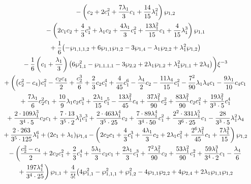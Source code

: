 \documentclass[pdftex]{sigma}
\numberwithin{equation}{section}
\begin{document}
\begin{gather*}
\hphantom{0=}{}
 - \left(c_2 + 2c_1^2 + \frac{7\lambda_1}{3} c_1 + \frac{14}{15}\lambda_1^2 \right) \wp_{1,2}\\
\hphantom{0=}{}
 - \left(2 c_1 c_2 + \frac{4}{3} c_1^3 + \lambda_1 c_2 + \frac{4 \lambda_1}{3} c_1^2 + \frac{13 \lambda_1^2}{15} c_1 + \frac{4}{15}\lambda_1^3 \right) \wp_{1,1}\\
 \hphantom{0=}{}
 + \frac{1}{6} \big({-} \wp_{1,1,1,2} + 6 \wp_{1,1}\wp_{1,2} - 3 \wp_{1,4}
 - \lambda_1 \wp_{2,2} + \lambda_1^2 \wp_{1,2}\big)\\
\hphantom{0=}{}
 - \frac{1}{6} \left(c_1+\frac{\lambda_1}{3}\right) \big( 6 \wp_{1,1}^2 - \wp_{1,1,1,1} - 3\wp_{2,2} + 2 \lambda_1 \wp_{1,2}
 + \lambda_1^2 \wp_{1,1} + 2\lambda_4\big) \bigg) \xi^{-3}\\
\hphantom{0=}{} +
 \left( \big(c_2^2 - c_4\big) c_1^2 - \frac{c_2 c_4}{2}
 + \frac{c_2^3}{6} + \frac{2}{3} c_2 c_1^4 + \frac{4}{45} c_1^6 - \frac{ \lambda _4}{2}c_2 -\frac{11\lambda_4}{15} c_1^2 - \frac{7^2}{90} \lambda _1 \lambda_4 c_1-\frac{9\lambda_1}{10} c_4 c_1\right. \\
\hphantom{0=}{}
+ \frac{7\lambda_1}{6} c_2^2 c_1 + \frac{10}{9} \lambda_1 c_2 c_1^3 + \frac{2 \lambda_1}{15} c_1^5 - \frac{13\lambda_1^2}{45} c_4 + \frac{37\lambda _1^2}{90} c_2^2 + \frac{83 \lambda_1^2}{90} c_2 c_1^2 + \frac{19 \lambda_1^2}{3^3 \cdot 5} c_1^4\\
\hphantom{0=}{} + \frac{2\cdot 109\lambda_1^3}{3^4 \cdot 5} c_2 c_1+ \frac{7\cdot 13}{3^5 \cdot 2} \lambda_1^3 c_1^3 + \frac{2 \cdot 463 \lambda_1^4}{3^5 \cdot 25} c_2 + \frac{7\cdot 89 \lambda_1^4}{3^4\cdot 50}c_1^2
 + \frac{2^2 \cdot 331 \lambda_1^5}{3^6 \cdot 25} c_1 - \frac{28}{3^3 \cdot 5} \lambda_1^2 \lambda_4 \\
\hphantom{0=}{}
 + \frac{2 \cdot 263}{3^5 \cdot 125}\lambda _1^6 + (2c_1+\lambda_1)\wp_{1,4} - \left(2 c_2 c_1 + \frac{4}{3} c_1^3 + \frac{4 \lambda_1}{3} c_2
 + 2\lambda_1 c_1^2 + \frac{2^{6} \lambda _1^2}{45} c_1 + \frac{7\lambda _1^3}{15}\right)\wp_{1,2}\\
\hphantom{0=}{}
 - \left(\frac{c_2^2-c_4}{2} + 2 c_2c_1^2 + \frac{2}{3} c_1^4 + \frac{5 \lambda_1}{3} c_2 c_1 + \frac{2 \lambda_1}{3} c_1^3 + \frac{7^2 \lambda_1^2}{90} c_2 + \frac{53 \lambda_1^2}{90} c_1^2
 + \frac{59 \lambda _1^3}{3^4\cdot 2} c_1 -\frac{\lambda _4}{6}\right.\\
 \left.\hphantom{0=}{} + \frac{197 \lambda_1^4}{3^4\cdot 25}\right) \wp_{1,1} + \frac{4}{5!} \big(4\wp_{1,1}^2 - \wp_{1,1,1}^2 + \wp_{1,2}^2
 - 4 \wp_{1,1} \wp_{2,2} + 4 \wp_{2,4} + 2 \lambda_1 \wp_{1,1} \wp_{1,2}

\end{gather*}
\end{document}
